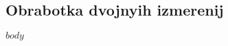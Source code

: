 \documentclass{article}
\begin{document}
\begin{center}
\section*{Obrabotka dvojnyih izmerenij}
\end{center}

$body$
\end{document}
